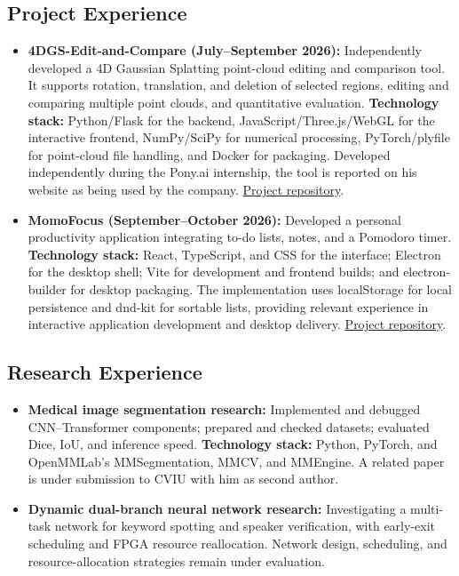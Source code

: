 \documentclass[a4paper,12pt]{article}
\begin{document}
\subsection*{Project Experience}
\begin{itemize}
  \item \textbf{4DGS-Edit-and-Compare (July--September 2026):} Independently developed a 4D Gaussian Splatting point-cloud editing and comparison tool. It supports rotation, translation, and deletion of selected regions, editing and comparing multiple point clouds, and quantitative evaluation. \textbf{Technology stack:} Python/Flask for the backend, JavaScript/Three.js/WebGL for the interactive frontend, NumPy/SciPy for numerical processing, PyTorch/plyfile for point-cloud file handling, and Docker for packaging. Developed independently during the Pony.ai internship, the tool is reported on his website as being used by the company. \href{https://github.com/qianqqqqqXZQ/4DGS-Edit-and-Compare}{Project repository}.
  \item \textbf{MomoFocus (September--October 2026):} Developed a personal productivity application integrating to-do lists, notes, and a Pomodoro timer. \textbf{Technology stack:} React, TypeScript, and CSS for the interface; Electron for the desktop shell; Vite for development and frontend builds; and electron-builder for desktop packaging. The implementation uses localStorage for local persistence and dnd-kit for sortable lists, providing relevant experience in interactive application development and desktop delivery. \href{https://github.com/qianqqqqqXZQ/MomoFocus}{Project repository}.
\end{itemize}

\subsection*{Research Experience}
\begin{itemize}
  \item \textbf{Medical image segmentation research:} Implemented and debugged CNN--Transformer components; prepared and checked datasets; evaluated Dice, IoU, and inference speed. \textbf{Technology stack:} Python, PyTorch, and OpenMMLab's MMSegmentation, MMCV, and MMEngine. A related paper is under submission to CVIU with him as second author.
  \item \textbf{Dynamic dual-branch neural network research:} Investigating a multi-task network for keyword spotting and speaker verification, with early-exit scheduling and FPGA resource reallocation. Network design, scheduling, and resource-allocation strategies remain under evaluation.
\end{itemize}
\end{document}
